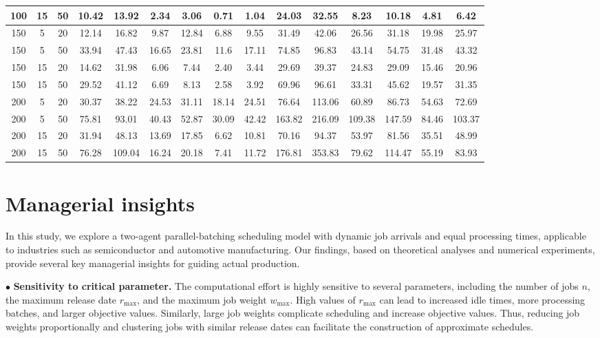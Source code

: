 \documentclass[12pt]{article}
\begin{document}
\begin{sloppypar}
\begin{table}[H]
\begin{center}
\begin{tabular}{|ccc|cc|cc|cc|cc|cc|cc|}
100 & 15 & 50 & 10.42 &	13.92 &	2.34 & 3.06 & 0.71 & 1.04 & 24.03 &	32.55 &	8.23 & 10.18 & 4.81 &	6.42 \\ \hline
150 & 5 & 20 & 12.14 & 16.82 & 9.87 & 12.84 & 6.88 & 9.55 & 31.49 &	42.06 &	26.56 &	31.18 &	19.98 & 25.97 \\ \hline
150 & 5 & 50 & 33.94 & 47.43 & 16.65 & 23.81 & 11.6 & 17.11 & 74.85 & 96.83 & 43.14 & 54.75 & 31.48 & 43.32 \\ \hline
150 & 15 & 20 & 14.62 &	31.98 &	6.06 & 7.44 & 2.40 & 3.44 & 29.69 &	39.37 &	24.83 &	29.09 & 15.46 & 20.96 \\ \hline
150 & 15 & 50 & 29.52 &	41.12 &	6.69 & 8.13 & 2.58 & 3.92 & 69.96 &	96.61 &	33.31 &	45.62 &	19.57 & 31.35 \\ \hline
200 & 5 & 20 & 30.37 & 38.22 & 24.53 & 31.11 & 18.14 & 24.51 & 76.64 & 113.06 &	60.89 &	86.73 & 54.63 & 72.69 \\ \hline
200 & 5 & 50 & 75.81 & 93.01 & 40.43 & 52.87 & 30.09 & 42.42 & 163.82 &	216.09 & 109.38 & 147.59 & 84.46 &	103.37 \\ \hline
200 & 15 & 20 & 31.94 &	48.13 &	13.69 &	17.85 &	6.62 & 10.81 & 70.16 & 94.37 & 53.97 & 81.56 & 35.51 & 48.99 \\ \hline
200 & 15 & 50 & 76.28 & 109.04 & 16.24 & 20.18 & 7.41 & 11.72 & 176.81 & 353.83 & 79.62 & 114.47 & 55.19 &	83.93 \\ \hline
\end{tabular}
\end{center}
\end{table}

\section{Managerial insights}

In this study, we explore a two-agent parallel-batching scheduling model with dynamic job arrivals and equal processing times, applicable to industries such as semiconductor and automotive manufacturing. Our findings, based on theoretical analyses and numerical experiments, provide several key managerial insights for guiding actual production.

$\bullet$ \textbf{Sensitivity to critical parameter.} The computational effort is highly sensitive to several parameters, including the number of jobs $n$, the maximum release date $r_{\max}$, and the maximum job weight $w_{\max}$. High values of $r_{\max}$ can lead to increased idle times, more processing batches, and larger objective values. Similarly, large job weights complicate scheduling and increase objective values. Thus, reducing job weights proportionally and clustering jobs with similar release dates can facilitate the construction of approximate schedules.


\end{sloppypar}
\end{document}
